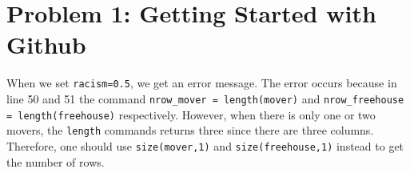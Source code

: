 \section*{Problem 1: Getting Started with Github}
When we set \texttt{racism=0.5}, we get an error message. The error occurs because in line 50 and 51 the command \texttt{nrow\_mover = length(mover)} and \texttt{nrow\_freehouse = length(freehouse)} respectively. However, when there is only one or two movers, the \texttt{length} commands returns three since there are three columns. Therefore, one should use \texttt{size(mover,1)} and \texttt{size(freehouse,1)} instead to get the number of rows. 
